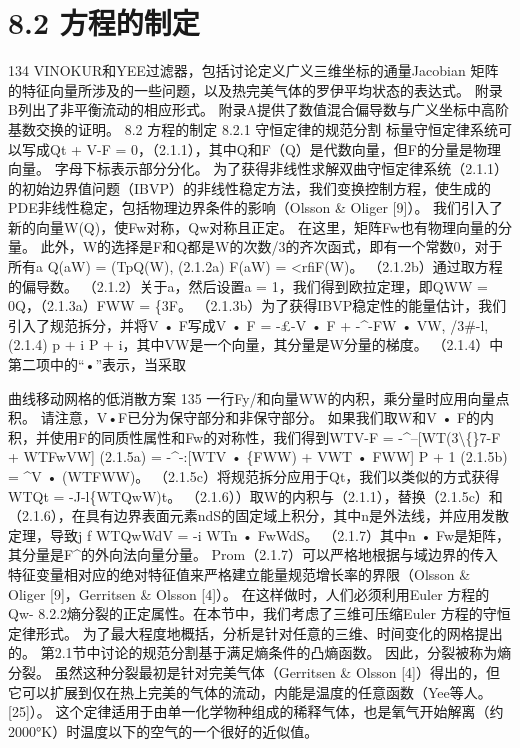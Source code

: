 \documentclass[UTF8,11pt,a4paper,openany,fontset=fandol]{ctexbook}
\begin{document}
\section{8.2 方程的制定}
134 VINOKUR和YEE过滤器，包括讨论定义广义三维坐标的通量Jacobian 矩阵的特征向量所涉及的一些问题，以及热完美气体的罗伊平均状态的表达式。 附录B列出了非平衡流动的相应形式。 附录A提供了数值混合偏导数与广义坐标中高阶基数交换的证明。 8.2 方程的制定 8.2.1 守恒定律的规范分割 标量守恒定律系统可以写成Qt + V-F = 0，（2.1.1），其中Q和F（Q）是代数向量，但F的分量是物理向量。 字母下标表示部分分化。 为了获得非线性求解双曲守恒定律系统（2.1.1）的初始边界值问题（IBVP）的非线性稳定方法，我们变换控制方程，使生成的PDE非线性稳定，包括物理边界条件的影响（Olsson \& Oliger [9]）。 我们引入了新的向量W(Q)，使Fw对称，Qw对称且正定。 在这里，矩阵Fw也有物理向量的分量。 此外，W的选择是F和Q都是W的次数/3的齐次函式，即有一个常数0，对于所有a Q(aW) = (TpQ(W), (2.1.2a) F(aW) = <rfiF(W)。 （2.1.2b）通过取方程的偏导数。 （2.1.2）关于a，然后设置a = 1，我们得到欧拉定理，即QWW = 0Q，（2.1.3a）FWW = \{3F。 （2.1.3b）为了获得IBVP稳定性的能量估计，我们引入了规范拆分，并将V • F写成V • F = -£-V • F + -\textasciicircum{}-FW • VW, /3\#-l, (2.1.4) p + i P + i，其中VW是一个向量，其分量是W分量的梯度。 （2.1.4）中第二项中的“•”表示，当采取

曲线移动网格的低消散方案 135 一行Fy/和向量WW的内积，乘分量时应用向量点积。 请注意，V•F已分为保守部分和非保守部分。 如果我们取W和V • F的内积，并使用F的同质性属性和Fw的对称性，我们得到WTV-F = -\textasciicircum{}--[WT(3\textbackslash\{\}7-F + WTFwVW] (2.1.5a) = -\textasciicircum{}-:[WTV • \{FWW) + VWT • FWW] P + 1 (2.1.5b) = \textasciicircum{}V • (WTFWW)。 （2.1.5c）将规范拆分应用于Qt，我们以类似的方式获得WTQt = -J-l\{WTQwW)t。 （2.1.6））取W的内积与（2.1.1），替换（2.1.5c）和（2.1.6），在具有边界表面元素ndS的固定域上积分，其中n是外法线，并应用发散定理，导致j f WTQwWdV = -i WTn • FwWdS。 （2.1.7）其中n • Fw是矩阵，其分量是F\textasciicircum{}的外向法向量分量。 Prom（2.1.7）可以严格地根据与域边界的传入特征变量相对应的绝对特征值来严格建立能量规范增长率的界限（Olsson \& Oliger [9]，Gerritsen \& Olsson [4]）。 在这样做时，人们必须利用Euler 方程的Qw- 8.2.2熵分裂的正定属性。在本节中，我们考虑了三维可压缩Euler 方程的守恒定律形式。 为了最大程度地概括，分析是针对任意的三维、时间变化的网格提出的。 第2.1节中讨论的规范分割基于满足熵条件的凸熵函数。 因此，分裂被称为熵分裂。 虽然这种分裂最初是针对完美气体（Gerritsen \& Olsson [4]）得出的，但它可以扩展到仅在热上完美的气体的流动，内能是温度的任意函数（Yee等人。 [25]）。 这个定律适用于由单一化学物种组成的稀释气体，也是氧气开始解离（约2000°K）时温度以下的空气的一个很好的近似值。
\end{document}
